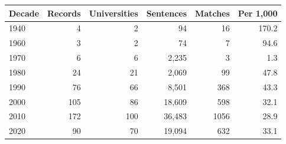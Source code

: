 \begin{tabular}{lrrrrr}
\toprule
Decade & Records & Universities & Sentences & Matches & Per 1,000 \\
\midrule
1940 & 4 & 2 & 94 & 16 & 170.2 \\
1960 & 3 & 2 & 74 & 7 & 94.6 \\
1970 & 6 & 6 & 2,235 & 3 & 1.3 \\
1980 & 24 & 21 & 2,069 & 99 & 47.8 \\
1990 & 76 & 66 & 8,501 & 368 & 43.3 \\
2000 & 105 & 86 & 18,609 & 598 & 32.1 \\
2010 & 172 & 100 & 36,483 & 1056 & 28.9 \\
2020 & 90 & 70 & 19,094 & 632 & 33.1 \\
\bottomrule
\end{tabular}
